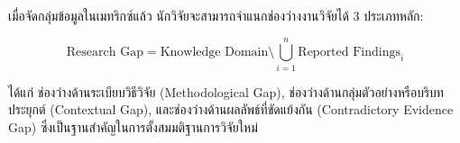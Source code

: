 เมื่อจัดกลุ่มข้อมูลในเมทริกซ์แล้ว นักวิจัยจะสามารถจำแนกช่องว่างงานวิจัยได้ 3 ประเภทหลัก:

\begin{equation}
\text{Research Gap} = \text{Knowledge Domain} \setminus \bigcup_{i=1}^n \text{Reported Findings}_i
\end{equation}

ได้แก่ ช่องว่างด้านระเบียบวิธีวิจัย (Methodological Gap), ช่องว่างด้านกลุ่มตัวอย่างหรือบริบทประยุกต์ (Contextual Gap), และช่องว่างด้านผลลัพธ์ที่ขัดแย้งกัน (Contradictory Evidence Gap) ซึ่งเป็นฐานสำคัญในการตั้งสมมติฐานการวิจัยใหม่

